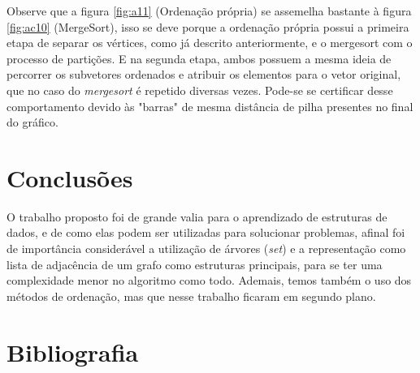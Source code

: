 \documentclass{article}
\begin{document}


Observe que a figura \ref{fig:a11} (Ordenação própria) se assemelha bastante à figura \ref{fig:ac10} (MergeSort), isso se deve porque a ordenação própria possui a primeira etapa de separar os vértices, como já descrito anteriormente, e o mergesort com o processo de partições. 
E na segunda etapa, ambos possuem a mesma ideia de percorrer os subvetores ordenados e atribuir os elementos para o vetor original, que no caso do \emph{mergesort} é repetido diversas vezes. Pode-se se certificar desse comportamento devido às "barras" de mesma distância de pilha presentes no final do gráfico. 


\section{Conclusões}

O trabalho proposto foi de grande valia para o aprendizado de estruturas de dados, e de como elas podem ser utilizadas para solucionar problemas, afinal foi de importância considerável a utilização de árvores (\emph{set}) e a representação como lista de adjacência de um grafo como estruturas principais, para se ter uma complexidade menor no algoritmo como todo. Ademais, temos também o uso dos métodos de ordenação, mas que nesse trabalho ficaram em segundo plano.


\section*{Bibliografia}
\end{document}
